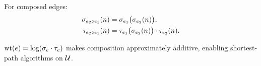 \begin{proposition}\label{overhead-compose}
\leanok
{}
For composed edges:
\begin{align}
\sigma_{e_2 \circ e_1}(n) &= \sigma_{e_1}\bigl(\sigma_{e_2}(n)\bigr), \\
\tau_{e_2 \circ e_1}(n) &= \tau_{e_1}\bigl(\sigma_{e_2}(n)\bigr) \cdot \tau_{e_2}(n).
\end{align}
\end{proposition}

\begin{definition}\label{scalar-weight}
\notready
$\mathrm{wt}(e) = \log(\sigma_e \cdot \tau_e)$ makes composition approximately additive,
enabling shortest-path algorithms on $\mathcal{U}$.
\end{definition}
